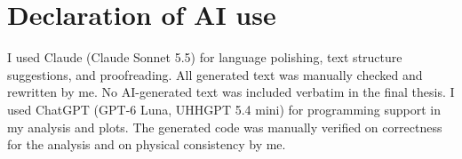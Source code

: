 \chapter*{Declaration of AI use}

I used Claude (Claude Sonnet 5.5) for language polishing, text structure suggestions, and proofreading. All generated text was manually checked and rewritten by me. No AI-generated text was included verbatim in the final thesis. I used ChatGPT (GPT-6 Luna, UHHGPT 5.4 mini) for programming support in my analysis and plots. The generated code was manually verified on correctness for the analysis and on physical consistency by me.